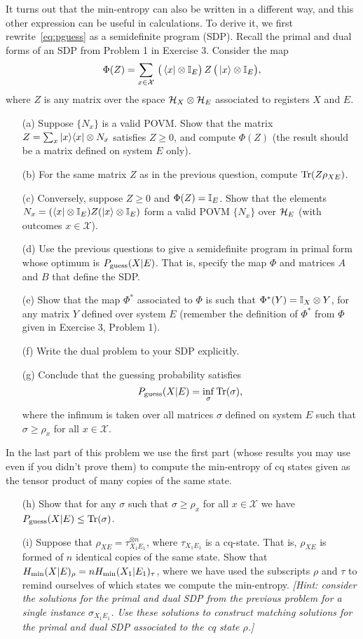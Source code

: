 \documentclass[12pt]{article}
\newcommand{\pguess}{P_{\rm guess}}
\begin{document}
\begin{enumerate}
It turns out that the min-entropy can also be written in a different way, and this other expression can be useful in calculations. To derive it, we first rewrite~\eqref{eq:pguess} as a semidefinite program (SDP). Recall the primal and dual forms of an SDP from Problem 1 in Exercise 3.  Consider the map 
$$\Phi(Z) = \sum_{x\in\mathcal{X}} \,\big(\bra{x} \otimes \mathbb{I}_E\big) \,Z\, \big(\ket{x}\otimes\mathbb{I}_E\big),$$
where $Z$ is any matrix over the space $\mathcal{H}_X\otimes \mathcal{H}_E$ associated to registers $X$ and $E$. 
\begin{enumerate}
\item[(a)] Suppose $\{N_x\}$ is a valid POVM. Show that the matrix $Z = \sum_x \ket{x}\!\bra{x}\otimes N_x$ satisfies $Z\geq 0 $, and compute $\Phi(Z)$ (the result should be a matrix defined on system $E$ only).
\item[(b)] For the same matrix $Z$ as in the previous question, compute $\mathrm{Tr}(Z\rho_{XE})$. 
\item[(c)] Conversely, suppose $Z \geq 0$ and $\Phi(Z) = \mathbb{I}_E$. Show that the elements $N_x = (\bra{x} \otimes \mathbb{I}_E) Z (\ket{x}\otimes\mathbb{I}_E)$ form a valid POVM $\{N_x\}$ over $\mathcal{H}_E$ (with outcomes $x\in \mathcal{X}$).  
\item[(d)] Use the previous questions to give a semidefinite program in primal form whose optimum is $\pguess(X|E)$. That is, specify the map $\Phi$ and matrices $A$ and $B$ that define the SDP.  
\item[(e)] Show that the map $\Phi^*$ associated to $\Phi$ is such that $\Phi^*(Y) = \mathbb{I}_X \otimes Y$, for any matrix $Y$ defined over system $E$ (remember the definition of $\Phi^*$ from $\Phi$ given in Exercise 3, Problem 1).
\item[(f)] Write the dual problem to your SDP explicitly. 
\item[(g)] Conclude that the guessing probability satisfies
$$ \pguess(X|E) = \inf_\sigma \Tr(\sigma),$$
 where the infimum is taken over all matrices $\sigma$ defined on system $E$ such that $\sigma \geq \rho_x$ for all $x\in\mathcal{X}$. 
\end{enumerate}
In the last part of this problem we use the first part (whose results you may use even if you didn't prove them) to compute the min-entropy of cq states given as the tensor product of many copies of the same state. 
\begin{enumerate}
\item[(h)] Show that for any $\sigma$ such that $\sigma \geq \rho_x$ for all $x \in \mathcal{X}$ we have $\pguess(X|E)\leq \Tr(\sigma)$.
\item[(i)] Suppose that $\rho_{XE} = \tau_{X_1E_1}^{\otimes n}$, where $\tau_{X_1E_1}$ is a cq-state. That is, $\rho_{XE}$ is formed of $n$ identical copies of the same state. Show that $H_{\rm min}(X|E)_\rho = n H_{\rm min}(X_1|E_1)_\tau$, where we have used the subscripts $\rho$ and $\tau$ to remind ourselves
of which states we compute the min-entropy. \emph{[Hint: consider the solutions for the primal and dual SDP from the previous problem for a single instance $\sigma_{X_1E_1}$. Use these solutions to construct matching solutions for the primal and dual SDP associated to the cq state $\rho$.]}
\end{enumerate}

\end{enumerate}
\end{document}
